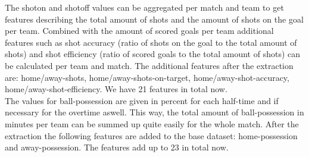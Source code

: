 The shoton and shotoff values can be aggregated per match and team to get features describing the total amount of shots and the amount of shots on the goal per team. Combined with the amount of scored goals per team additional features such as shot accuracy (ratio of shots on the goal to the total amount of shots) and shot efficiency (ratio of scored goals to the total amount of shots) can be calculated per team and match.
\newline
The additional features after the extraction are: home/away-shots, home/away-shots-on-target, home/away-shot-accuracy, home/away-shot-efficiency. We have 21 features in total now.
\\
The values for ball-possession are given in percent for each half-time and if necessary for the overtime aswell. This way, the total amount of ball-possession in minutes per team can be summed up quite easily for the whole match.
\newline
After the extraction the following features are added to the base dataset: home-possession and away-possession. The features add up to 23 in total now.

